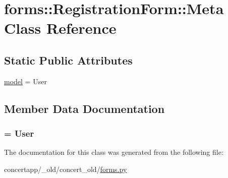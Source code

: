 \hypertarget{classforms_1_1_registration_form_1_1_meta}{
\section{forms::RegistrationForm::Meta Class Reference}
\label{classforms_1_1_registration_form_1_1_meta}
}
\subsection*{Static Public Attributes}
\begin{DoxyCompactItemize}
\item 
\hyperlink{classforms_1_1_registration_form_1_1_meta_a7b09b563342f64bddbe4085a13bd0beb}{model} = User
\end{DoxyCompactItemize}


\subsection{Member Data Documentation}
\hypertarget{classforms_1_1_registration_form_1_1_meta_a7b09b563342f64bddbe4085a13bd0beb}{
\subsubsection[{model}]{ = User}}
\label{classforms_1_1_registration_form_1_1_meta_a7b09b563342f64bddbe4085a13bd0beb}


The documentation for this class was generated from the following file:\begin{DoxyCompactItemize}
\item 
concertapp/\_\-old/concert\_\-old/\hyperlink{__old_2concert__old_2forms_8py}{forms.py}\end{DoxyCompactItemize}
